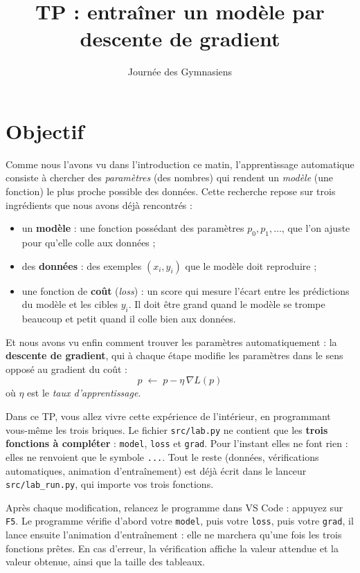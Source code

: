 \documentclass[11pt]{article}
\title{\textbf{TP : entraîner un modèle par descente de gradient}}
\author{Journée des Gymnasiens}
\date{}
\newcommand{\code}[1]{\texttt{#1}}
\newcommand{\fonction}[1]{\code{#1}}
\begin{document}
\maketitle

\section*{Objectif}

Comme nous l'avons vu dans l'introduction ce matin, l'apprentissage
automatique consiste à chercher des \emph{paramètres} (des nombres) qui
rendent un \emph{modèle} (une fonction) le plus proche possible des
données. Cette recherche repose sur trois ingrédients que nous avons
déjà rencontrés :

\begin{itemize}
  \item un \textbf{modèle} : une fonction possédant des paramètres
        $p_0, p_1, \dots$, que l'on ajuste pour qu'elle colle aux données ;
  \item des \textbf{données} : des exemples $(x_i, y_i)$ que le modèle doit
        reproduire ;
  \item une fonction de \textbf{coût} (\emph{loss}) : un score qui mesure
        l'écart entre les prédictions du modèle et les cibles $y_i$.
        Il doit être grand quand le modèle se trompe beaucoup et petit quand
        il colle bien aux données.
\end{itemize}

Et nous avons vu enfin comment trouver les paramètres automatiquement :
la \textbf{descente de gradient}, qui à chaque étape modifie les
paramètres dans le sens opposé au gradient du coût :
\[
  p \;\leftarrow\; p - \eta\, \nabla L(p)
\]
où $\eta$ est le \emph{taux d'apprentissage}.

\medskip
Dans ce TP, vous allez vivre cette expérience de l'intérieur, en
programmant vous-même les trois briques. Le fichier \code{src/lab.py}
ne contient que les \textbf{trois fonctions à compléter} :
\fonction{model}, \fonction{loss} et \fonction{grad}. Pour l'instant elles
ne font rien : elles ne renvoient que le symbole \code{...}. Tout le
reste (données, vérifications automatiques, animation d'entraînement) est
déjà écrit dans le lanceur \code{src/lab\_run.py}, qui importe vos trois
fonctions.

\medskip
Après chaque modification, relancez le programme dans VS Code : appuyez
sur \code{F5}. Le programme vérifie d'abord votre
\fonction{model}, puis votre \fonction{loss}, puis votre \fonction{grad}, il lance ensuite l'animation
d'entraînement : elle ne marchera qu'une fois les trois fonctions prêtes.
En cas d'erreur, la vérification affiche la valeur attendue et la valeur
obtenue, ainsi que la taille des tableaux.
\end{document}
